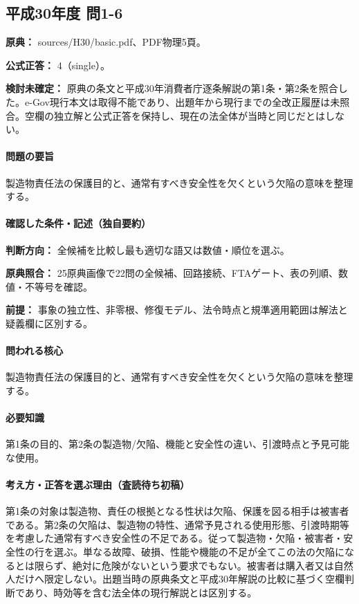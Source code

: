 \subsection{平成30年度 問1-6}
\label{q:h30-reg-basic-1-6}

\noindent\textbf{原典：} sources/H30/basic.pdf、PDF物理5頁。

\textbf{公式正答：} 4（single）。

\par\textbf{検討未確定：} 原典の条文と平成30年消費者庁逐条解説の第1条・第2条を照合した。e-Gov現行本文は取得不能であり、出題年から現行までの全改正履歴は未照合。空欄の独立解と公式正答を保持し、現在の法全体が当時と同じだとはしない。

\paragraph{問題の要旨} 製造物責任法の保護目的と、通常有すべき安全性を欠くという欠陥の意味を整理する。

\paragraph{確認した条件・記述（独自要約）}\mbox{}\par

\noindent\textbf{判断方向：} 全候補を比較し最も適切な語又は数値・順位を選ぶ。\par

\noindent\textbf{原典照合：} 25原典画像で22問の全候補、回路接続、FTAゲート、表の列順、数値・不等号を確認。\par

\noindent\textbf{前提：} 事象の独立性、非零根、修復モデル、法令時点と規準適用範囲は解法と疑義欄に区別する。\par

\paragraph{問われる核心} 製造物責任法の保護目的と、通常有すべき安全性を欠くという欠陥の意味を整理する。

\paragraph{必要知識} 第1条の目的、第2条の製造物/欠陥、機能と安全性の違い、引渡時点と予見可能な使用。

\paragraph{考え方・正答を選ぶ理由（査読待ち初稿）} 第1条の対象は製造物、責任の根拠となる性状は欠陥、保護を図る相手は被害者である。第2条の欠陥は、製造物の特性、通常予見される使用形態、引渡時期等を考慮した通常有すべき安全性の不足である。従って製造物・欠陥・被害者・安全性の行を選ぶ。単なる故障、破損、性能や機能の不足が全てこの法の欠陥になるとは限らず、絶対に危険がないという要求でもない。被害者は購入者又は自然人だけへ限定しない。出題当時の原典条文と平成30年解説の比較に基づく空欄判断であり、時効等を含む法全体の現行解説とは区別する。

